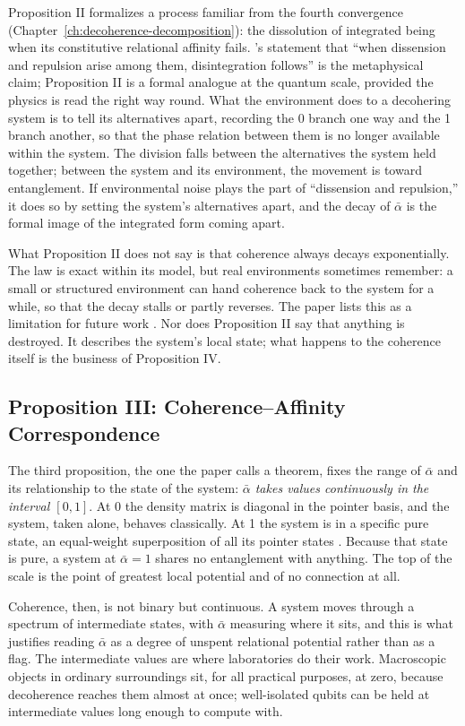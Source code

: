 Proposition II formalizes a process familiar from the fourth convergence (Chapter~\ref{ch:decoherence-decomposition}): the dissolution of integrated being when its constitutive relational affinity fails. \AbdulBaha's statement that ``when dissension and repulsion arise among them, disintegration follows'' \citep[Talk 41]{PUP} is the metaphysical claim; Proposition II is a formal analogue at the quantum scale, provided the physics is read the right way round. What the environment does to a decohering system is to tell its alternatives apart, recording the 0 branch one way and the 1 branch another, so that the phase relation between them is no longer available within the system. The division falls between the alternatives the system held together; between the system and its environment, the movement is toward entanglement. If environmental noise plays the part of ``dissension and repulsion,'' it does so by setting the system's alternatives apart, and the decay of $\bar{\alpha}$ is the formal image of the integrated form coming apart.

What Proposition II does not say is that coherence always decays exponentially. The law is exact within its model, but real environments sometimes remember: a small or structured environment can hand coherence back to the system for a while, so that the decay stalls or partly reverses. The paper lists this as a limitation for future work \citep{AdamsRCT}. Nor does Proposition II say that anything is destroyed. It describes the system's local state; what happens to the coherence itself is the business of Proposition IV.

\subsection*{Proposition III: Coherence–Affinity Correspondence}

The third proposition, the one the paper calls a theorem, fixes the range of $\bar{\alpha}$ and its relationship to the state of the system: \emph{$\bar{\alpha}$ takes values continuously in the interval $[0, 1]$}. At 0 the density matrix is diagonal in the pointer basis, and the system, taken alone, behaves classically. At 1 the system is in a specific pure state, an equal-weight superposition of all its pointer states \citep{AdamsRCT}. Because that state is pure, a system at $\bar{\alpha} = 1$ shares no entanglement with anything. The top of the scale is the point of greatest local potential and of no connection at all.

Coherence, then, is not binary but continuous. A system moves through a spectrum of intermediate states, with $\bar{\alpha}$ measuring where it sits, and this is what justifies reading $\bar{\alpha}$ as a degree of unspent relational potential rather than as a flag. The intermediate values are where laboratories do their work. Macroscopic objects in ordinary surroundings sit, for all practical purposes, at zero, because decoherence reaches them almost at once; well-isolated qubits can be held at intermediate values long enough to compute with.

